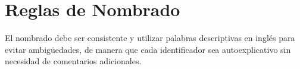 \section{Reglas de Nombrado}

El nombrado debe ser consistente y utilizar palabras descriptivas en inglés para evitar ambigüedades, de manera que cada identificador sea autoexplicativo sin necesidad de comentarios adicionales.











